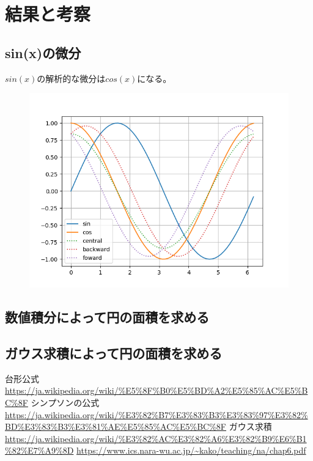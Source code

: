 \documentclass[dvipdfmx]{jsarticle}
\begin{document}
\section{結果と考察}

\subsection{sin(x)の微分}
$sin(x)$の解析的な微分は$cos(x)$になる。

\begin{figure}[H]
  \centering
  \includegraphics[width=0.7\hsize]{../pics/h=1.png}
  \caption{}
  \label{}
\end{figure}

\subsection{数値積分によって円の面積を求める}


\subsection{ガウス求積によって円の面積を求める}


\begin{thebibliography}{10}
   台形公式
  \url{https://ja.wikipedia.org/wiki/%E5%8F%B0%E5%BD%A2%E5%85%AC%E5%BC%8F}
   シンプソンの公式
  \url{https://ja.wikipedia.org/wiki/%E3%82%B7%E3%83%B3%E3%83%97%E3%82%BD%E3%83%B3%E3%81%AE%E5%85%AC%E5%BC%8F}
   ガウス求積
  \url{https://ja.wikipedia.org/wiki/%E3%82%AC%E3%82%A6%E3%82%B9%E6%B1%82%E7%A9%8D}
  \url{https://www.ics.nara-wu.ac.jp/~kako/teaching/na/chap6.pdf}

\end{thebibliography}
\end{document}
